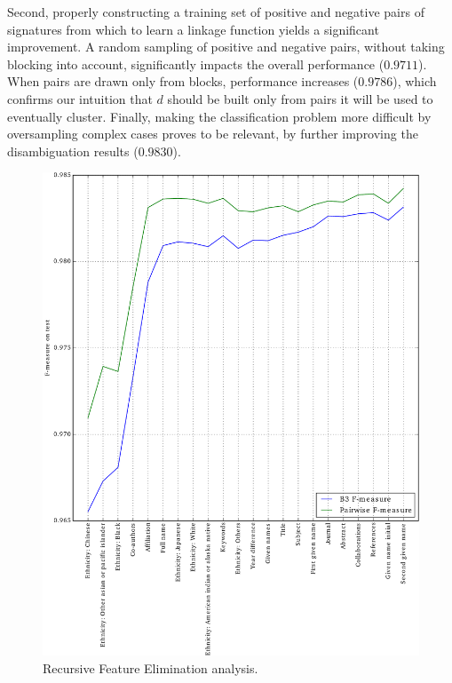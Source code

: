 \documentclass{article}
\begin{document}
Second, properly constructing a training set of positive and negative pairs of
signatures from which to learn a linkage function yields a significant
improvement.
A random sampling of positive and negative pairs, without taking
blocking into account, significantly impacts the overall performance
($0.9711$). When pairs are drawn only from blocks, performance increases
($0.9786$), which confirms our intuition that $d$ should be built only from
pairs it will be used to eventually cluster. Finally, making the classification
problem more difficult by oversampling complex cases proves to be relevant,
by further improving the disambiguation results ($0.9830$).

\begin{figure}
\centering
\caption{Recursive Feature Elimination analysis. }
\label{fig:rfe}
\includegraphics[width=\textwidth]{fig-rfe.pdf}
\end{figure}
\end{document}
